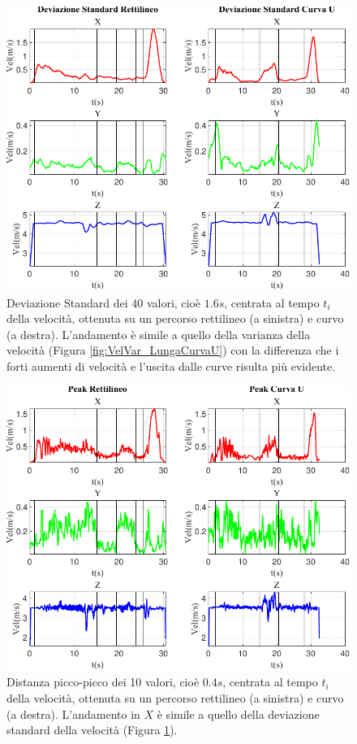 \documentclass[class=article]{standalone}
\begin{document}
	\begin{center}
		\begin{figure}[h!]
			\centering\includegraphics[width=.7\textwidth]{img/LungaCurvaU/Vel/Deviazione Standard}
			\caption[]{Deviazione Standard dei 40 valori, cioè \(1.6s\), centrata al tempo \(t_{i}\) della velocità, ottenuta su un percorso rettilineo (a sinistra) e curvo (a destra). L'andamento è simile a quello della varianza della velocità (Figura \ref{fig:VelVar_LungaCurvaU}) con la differenza che i forti aumenti di velocità e l'uscita dalle curve risulta più evidente.}
			\label{fig:VelStd_LungaCurvaU}
		\end{figure}
	\end{center}
	
	\begin{center}
		\begin{figure}[h!]
			\centering\includegraphics[width=.7\textwidth]{img/LungaCurvaU/Vel/Peak}
			\caption[]{Distanza picco-picco dei 10 valori, cioè \(0.4s\), centrata al tempo \(t_{i}\) della velocità, ottenuta su un percorso rettilineo (a sinistra) e curvo (a destra). L'andamento in \(X\) è simile a quello della deviazione standard della velocità (Figura \ref{fig:VelStd_LungaCurvaU}).}
			\label{fig:VelPeak_LungaCurvaU}
		\end{figure}
	\end{center}
		
\end{document}
